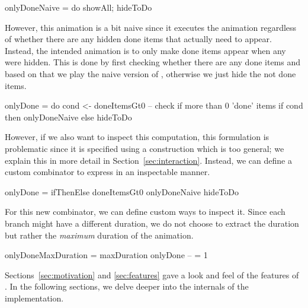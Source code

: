\begin{spec}
onlyDoneNaive = do showAll; hideToDo
\end{spec}

However, this animation is a bit naive since it executes the 
animation regardless of whether there are any hidden done items that actually
need to appear. Instead, the intended animation is to only make done items
appear when any were hidden. This is done by first checking whether there are
any done items and based on that we play the naive version of ,
otherwise we just hide the not done items.

\begin{spec}
onlyDone = do
  cond <- doneItemsGt0    -- check if more than 0 'done' items
  if cond then onlyDoneNaive else hideToDo
\end{spec}

However, if we also want to inspect this computation, this formulation
is problematic since it is specified using a construction which is too general;
we explain this in more detail in Section~\ref{sec:interaction}. Instead, we
can define a custom combinator  to express 
in an inspectable manner.

\begin{spec}
onlyDone = ifThenElse doneItemsGt0 onlyDoneNaive hideToDo
\end{spec}

For this new combinator, we can define custom ways to inspect it. Since each
branch might have a different duration, we do not choose to extract the
duration but rather the \emph{maximum} duration of the animation.

\begin{spec}
onlyDoneMaxDuration = maxDuration onlyDone -- = 1
\end{spec}

Sections~\ref{sec:motivation} and \ref{sec:features} gave a look and feel of the
features of \dsl{}. In the following sections, we delve deeper into the
internals of the implementation.
